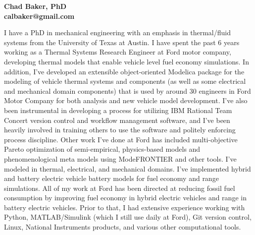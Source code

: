 \documentclass[11pt]{letter} %
\begin{document}

\begin{letter}{}


\begin{center}
\large\bf Chad Baker, PhD \\ %
calbaker@gmail.com %
\end{center} 
\vfill

\signature{Chad Baker} %


\opening{} I have a PhD in mechanical engineering with an emphasis in
thermal/fluid systems from the University of Texas at Austin.  I have
spent the past 6 years working as a Thermal Systems Research Engineer
at Ford motor company, developing thermal models that enable vehicle
level fuel economy simulations.  In addition, I've developed an
extensible object-oriented Modelica package for the modeling of
vehicle thermal systems and components (as well as some electrical and
mechanical domain components) that is used by around 30 engineers in
Ford Motor Company for both analysis and new vehicle model
development.  I've also been instrumental in developing a process for
utilizing IBM Rational Team Concert version control and workflow
management software, and I've been heavily involved in training others
to use the software and politely enforcing process discipline.  Other
work I've done at Ford has included multi-objective Pareto
optimization of semi-empirical, physics-based models and
phenomenological meta models using ModeFRONTIER and other tools.  I've
modeled in thermal, electrical, and mechanical domains.  I've
implemented hybrid and battery electric vehicle battery models for
fuel economy and range simulations. All of my work at Ford has been
directed at reducing fossil fuel consumption by improving fuel economy
in hybrid electric vehicles and range in battery electric vehicles.
Prior to that, I had extensive experience working with Python,
MATLAB/Simulink (which I still use daily at Ford), Git version
control, Linux, National Instruments products, and various other
computational tools.


\end{letter}
\end{document}
